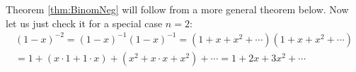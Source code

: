 

\setcounter{section}{2}
\setcounter{subsection}{4}
\setcounter{dfn}{14}


Theorem \ref{thm:BinomNeg} will follow from a more general theorem below.
Now let us just check it for a special case $n=2$:
\begin{multline*}
(1-x)^{-2} = (1-x)^{-1} (1-x)^{-1} = (1 + x + x^2 + \cdots)(1 + x + x^2 + \cdots)\\
= 1 + (x \cdot 1 + 1 \cdot x) + (x^2 + x \cdot x + x^2) + \cdots
= 1 + 2x + 3x^2 + \cdots
\end{multline*}




